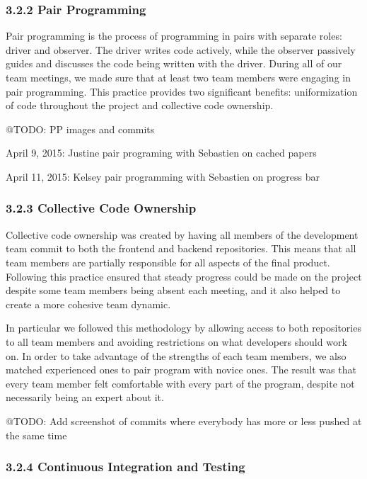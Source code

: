 \documentclass[]{article}
\begin{document}
\subsubsection{3.2.2 Pair Programming}\label{pair-programming}

Pair programming is the process of programming in pairs with separate
roles: driver and observer. The driver writes code actively, while the
observer passively guides and discusses the code being written with the
driver. During all of our team meetings, we made sure that at least two
team members were engaging in pair programming. This practice provides
two significant benefits: uniformization of code throughout the project
and collective code ownership.

@TODO: PP images and commits

April 9, 2015: Justine pair programing with Sebastien on cached papers

April 11, 2015: Kelsey pair programming with Sebastien on progress bar

\subsubsection{3.2.3 Collective Code
Ownership}\label{collective-code-ownership}

Collective code ownership was created by having all members of the
development team commit to both the frontend and backend repositories.
This means that all team members are partially responsible for all
aspects of the final product. Following this practice ensured that
steady progress could be made on the project despite some team members
being absent each meeting, and it also helped to create a more cohesive
team dynamic.

In particular we followed this methodology by allowing access to both
repositories to all team members and avoiding restrictions on what
developers should work on. In order to take advantage of the strengths
of each team members, we also matched experienced ones to pair program
with novice ones. The result was that every team member felt comfortable
with every part of the program, despite not necessarily being an expert
about it.

@TODO: Add screenshot of commits where everybody has more or less pushed
at the same time

\subsubsection{3.2.4 Continuous Integration and
Testing}\label{continuous-integration-and-testing}
\end{document}

